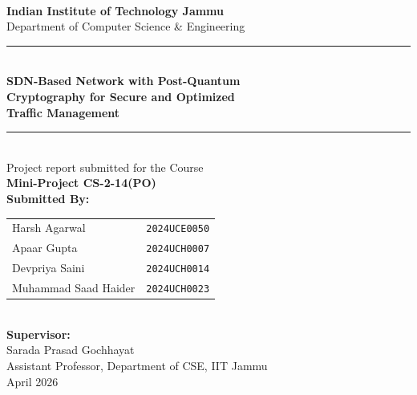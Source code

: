 \documentclass[12pt]{article}
\begin{document}

\thispagestyle{empty}
\begin{center}

    \vspace*{0.5cm}
    \\[0.5cm]

    {\large\bfseries Indian Institute of Technology Jammu}\\[0.15cm]
    {\normalsize Department of Computer Science \& Engineering}\\[0.5cm]

    \rule{\linewidth}{1.5pt}\\[0.3cm]

    {\LARGE\bfseries SDN-Based Network with Post-Quantum}\\[0.2cm]
    {\LARGE\bfseries Cryptography for Secure and Optimized}\\[0.2cm]
    {\LARGE\bfseries Traffic Management}\\[0.4cm]

    \rule{\linewidth}{0.8pt}\\[0.4cm]

    {\normalsize Project report submitted for the Course}\\[0.15cm]
    {\large\bfseries Mini-Project CS-2-14(PO)}\\[1.0cm]

    {\normalsize\bfseries Submitted By:}\\[0.2cm]
    \begin{tabular}{ll}
        Harsh Agarwal       & \texttt{2024UCE0050} \\[3pt]
        Apaar Gupta         & \texttt{2024UCH0007} \\[3pt]
        Devpriya Saini      & \texttt{2024UCH0014} \\[3pt]
        Muhammad Saad Haider & \texttt{2024UCH0023} \\
    \end{tabular}\\[1.0cm]

    {\normalsize\bfseries Supervisor:}\\[0.15cm]
    {\normalsize Sarada Prasad Gochhayat}\\
    {\small Assistant Professor, Department of CSE, IIT Jammu}\\[1.0cm]

    {\large April 2026}
    
\end{center}
\end{document}
